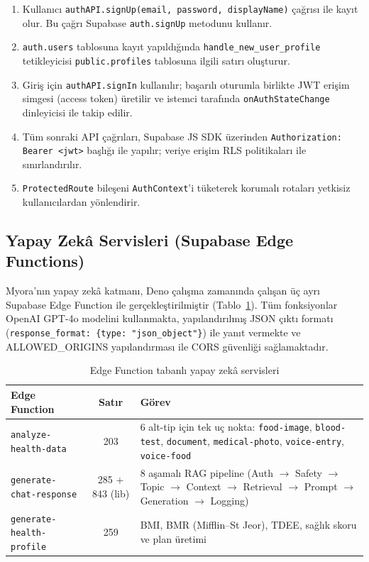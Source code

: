 \begin{enumerate}
    \item Kullanıcı \texttt{authAPI.signUp(email, password, displayName)} çağrısı ile kayıt olur. Bu çağrı Supabase \texttt{auth.signUp} metodunu kullanır.
    \item \texttt{auth.users} tablosuna kayıt yapıldığında \texttt{handle\_new\_user\_profile} tetikleyicisi \texttt{public.profiles} tablosuna ilgili satırı oluşturur.
    \item Giriş için \texttt{authAPI.signIn} kullanılır; başarılı oturumla birlikte JWT erişim simgesi (access token) üretilir ve istemci tarafında \texttt{onAuthStateChange} dinleyicisi ile takip edilir.
    \item Tüm sonraki API çağrıları, Supabase JS SDK üzerinden \texttt{Authorization: Bearer <jwt>} başlığı ile yapılır; veriye erişim RLS politikaları ile sınırlandırılır.
    \item \texttt{ProtectedRoute} bileşeni \texttt{AuthContext}'i tüketerek korumalı rotaları yetkisiz kullanıcılardan yönlendirir.
\end{enumerate}

\subsection{Yapay Zekâ Servisleri (Supabase Edge Functions)}

Myora'nın yapay zekâ katmanı, Deno çalışma zamanında çalışan üç ayrı Supabase Edge Function ile gerçekleştirilmiştir (Tablo~\ref{tab:ai_services}). Tüm fonksiyonlar OpenAI GPT-4o modelini kullanmakta, yapılandırılmış JSON çıktı formatı (\texttt{response\_format: \{type: "json\_object"\}}) ile yanıt vermekte ve ALLOWED\_ORIGINS yapılandırması ile CORS güvenliği sağlamaktadır.

\begin{table}[H]
\centering
\caption{Edge Function tabanlı yapay zekâ servisleri}
\label{tab:ai_services}
\begin{tabular}{|l|c|p{}|}
\hline
\textbf{Edge Function} & \textbf{Satır} & \textbf{Görev} \\
\hline
\texttt{analyze-health-data}     & 203 & 6 alt-tip için tek uç nokta: \texttt{food-image}, \texttt{blood-test}, \texttt{document}, \texttt{medical-photo}, \texttt{voice-entry}, \texttt{voice-food} \\
\texttt{generate-chat-response}  & 285 + 843 (lib) & 8 aşamalı RAG pipeline (Auth $\to$ Safety $\to$ Topic $\to$ Context $\to$ Retrieval $\to$ Prompt $\to$ Generation $\to$ Logging) \\
\texttt{generate-health-profile} & 259 & BMI, BMR (Mifflin--St Jeor), TDEE, sağlık skoru ve plan üretimi \\
\hline
\end{tabular}
\end{table}

